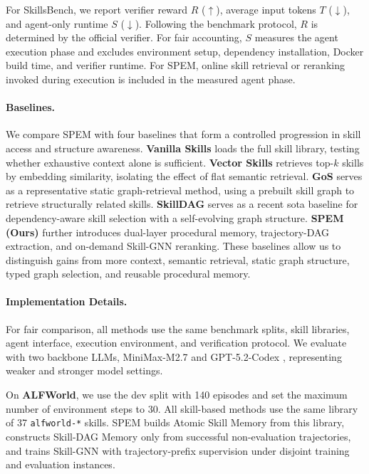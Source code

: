 \documentclass[letterpaper]{article} %
\newcommand{\model}{\textsc{SPEM}}
\begin{document}
For SkillsBench, we report verifier reward $R$ ($\uparrow$), average input tokens $T$ ($\downarrow$), and agent-only runtime $S$ ($\downarrow$).
Following the benchmark protocol, $R$ is determined by the official verifier.
For fair accounting, $S$ measures the agent execution phase and excludes environment setup, dependency installation, Docker build time, and verifier runtime. For \model{}, online skill retrieval or reranking invoked during execution is included in the measured agent phase.

\paragraph{Baselines.}
We compare \model{} with four baselines that form a controlled progression in
skill access and structure awareness. 
\textbf{Vanilla Skills} loads the full
skill library, testing whether exhaustive context alone is sufficient.
\textbf{Vector Skills} retrieves top-$k$ skills by embedding similarity,
isolating the effect of flat semantic retrieval.
\textbf{GoS} serves as a
representative static graph-retrieval method, using a prebuilt skill graph to
retrieve structurally related skills. 
\textbf{SkillDAG} serves as a recent
sota baseline for dependency-aware skill selection with
a self-evolving graph structure.
\textbf{\model{} (Ours)} further introduces
dual-layer procedural memory, trajectory-DAG extraction, and on-demand
Skill-GNN reranking. These baselines allow us to distinguish gains from more
context, semantic retrieval, static graph structure, typed graph selection, and
reusable procedural memory.

\paragraph{Implementation Details.}
For fair comparison, all methods use the same benchmark splits, skill libraries, agent interface, execution environment, and verification protocol.
We evaluate with two backbone LLMs, MiniMax-M2.7 \cite{minimax2026m27} and GPT-5.2-Codex \cite{openai2025gpt52codex}, representing weaker and stronger model settings.

On \textbf{ALFWorld}, we use the dev split with 140 episodes and set the maximum number of environment steps to 30.
All skill-based methods use the same library of 37 \texttt{alfworld-*} skills.
\model{} builds Atomic Skill Memory from this library, constructs Skill-DAG Memory only from successful non-evaluation trajectories, and trains Skill-GNN with trajectory-prefix supervision under disjoint training and evaluation instances.
\end{document}
